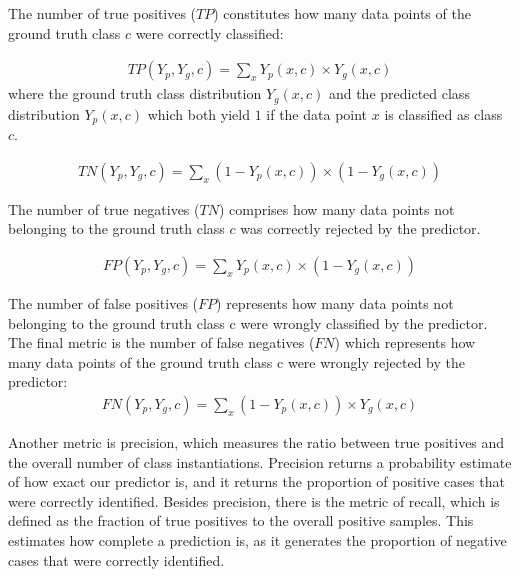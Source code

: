 The number of true positives ($TP$) constitutes how many data points of the ground truth class $c$ were correctly classified:


\begin{equation}
\begin{split}
TP\left ( Y_{p},Y_{g},c \right )=\sum_{x}^{}Y_{p}\left ( x,c \right )\times Y_{g}\left ( x, c \right )
\label{}
\end{split}
\end{equation}
where the ground truth class distribution $Y_{g} (x, c)$ and the predicted class distribution $Y_{p} (x, c)$ which both yield $1$ if the data point $x$  is classified as class $c$.

\begin{equation}
\begin{split}
TN\left ( Y_{p},Y_{g},c \right )=\sum_{x}^{}\left (1-Y_{p}\left ( x,c \right )  \right )\times \left ( 1-Y_{g}\left ( x,c \right ) \right ) 
\label{}
\end{split}
\end{equation}

The number of true negatives ($TN$) comprises how many data points not belonging to the ground truth class $c$ was correctly rejected by the predictor.

\begin{equation}
\begin{split}
FP\left ( Y_{p},Y_{g},c \right )=\sum_{x}^{}Y_{p}\left ( x,c \right )\times \left ( 1-Y_{g}\left ( x,c \right ) \right )
\label{}
\end{split}
\end{equation}

The number of false positives ($FP$) represents how many data points not belonging to the ground truth class c were wrongly classified by the predictor.
The final metric is the number of false negatives ($FN$) which represents how many data points of the ground truth class c were wrongly rejected by the predictor:
\begin{equation}
\begin{split}
FN\left ( Y_{p},Y_{g},c \right )=\sum_{x}^{}\left (1-Y_{p}\left ( x,c \right )  \right )\times Y_{g}\left ( x,c \right ) 
\label{}
\end{split}
\end{equation}


Another metric is precision, which measures the ratio between true positives and the overall number of class instantiations. Precision returns a probability estimate of how exact our predictor is, and it returns the proportion of positive cases that were correctly identified. Besides precision, there is the metric of recall, which is defined as the fraction of true positives to the overall positive samples. This estimates how complete a prediction is, as it generates the proportion of negative cases that were correctly identified.

